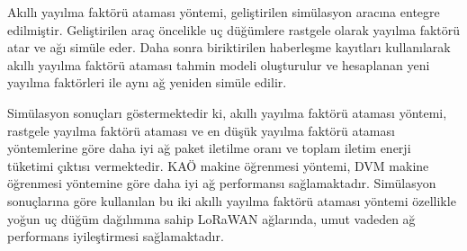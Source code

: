 Akıllı yayılma faktörü ataması yöntemi, geliştirilen simülasyon aracına entegre edilmiştir. Geliştirilen araç öncelikle uç düğümlere rastgele olarak yayılma faktörü atar ve ağı simüle eder. Daha sonra biriktirilen haberleşme kayıtları kullanılarak akıllı yayılma faktörü ataması tahmin modeli oluşturulur ve hesaplanan yeni yayılma faktörleri ile aynı ağ yeniden simüle edilir.

Simülasyon sonuçları göstermektedir ki, akıllı yayılma faktörü ataması yöntemi, rastgele yayılma faktörü ataması ve en düşük yayılma faktörü ataması yöntemlerine göre daha iyi ağ paket iletilme oranı ve toplam iletim enerji tüketimi çıktısı vermektedir. KAÖ makine öğrenmesi yöntemi, DVM makine öğrenmesi yöntemine göre daha iyi ağ performansı sağlamaktadır. Simülasyon sonuçlarına göre kullanılan bu iki akıllı yayılma faktörü ataması yöntemi özellikle yoğun uç düğüm dağılımına sahip LoRaWAN ağlarında, umut vadeden ağ performans iyileştirmesi sağlamaktadır.
